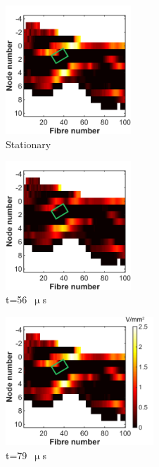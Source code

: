 \begin{figure}
    \centering
    \begin{subfigure}[t]{0.32\textwidth}
        \centering
        \includegraphics[height=4.85cm]{Simulations/TimeDep/anodAF-term4-hemi_gnd-stat_0001}
        \caption{Stationary}
        \label{fig:af_stat_anodic}
    \end{subfigure}%
    \begin{subfigure}[t]{0.32\textwidth}
        \centering
        \includegraphics[height=4.85cm]{Simulations/TimeDep/AF-term4-hemi_gnd-t56_0001}
        \caption{t=56~$ \upmu $s}
        \label{fig:af_t56}
    \end{subfigure}%
    \begin{subfigure}[t]{0.36\textwidth}
        \centering
        \includegraphics[height=4.85cm]{Simulations/TimeDep/AF-term4-hemi_gnd-t79_0001}
        \caption{t=79~$ \upmu $s}
        \label{fig:af_t79}
    \end{subfigure}\\%
    \vspace{1em}%
    \begin{subfigure}[t]{0.32\textwidth}

\end{subfigure}
\end{figure}
